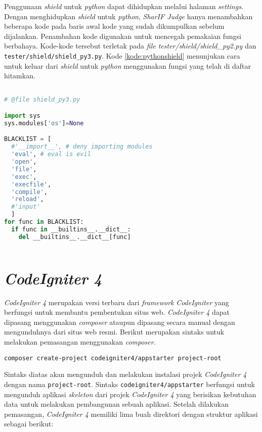 Penggunaan \textit{shield} untuk \textit{python} dapat dihidupkan melalui halaman \textit{settings}. Dengan menghidupkan \textit{shield} untuk \textit{python}, \textit{SharIF Judge} hanya menambahkan beberapa kode pada baris awal kode yang sudah dikumpulkan sebelum dijalankan. Penambahan kode digunakan untuk mencegah pemakaian fungsi berbahaya. Kode-kode tersebut terletak pada \textit{file tester/shield/shield\_py2.py} dan \texttt{tester/shield/shield\_py3.py}. Kode \ref{kode:pythonshield} menunjukan cara untuk keluar dari \textit{shield} untuk \textit{python} menggunakan fungsi yang telah di daftar hitamkan.

\begin{lstlisting}[language=Python,caption=Cara keluar dari \textit{shield} untuk \textit{python},label=kode:pythonshield]

# @file shield_py3.py

import sys
sys.modules['os']=None

BLACKLIST = [
  #'__import__', # deny importing modules
  'eval', # eval is evil
  'open',
  'file',
  'exec',
  'execfile',
  'compile',
  'reload',
  #'input'
  ]
for func in BLACKLIST:
  if func in __builtins__.__dict__:
    del __builtins__.__dict__[func]
    
\end{lstlisting}

\section{\textit{CodeIgniter 4}\cite{codeigniter:23:ci4}}
\label{sec:ci4}

\textit{CodeIgniter 4} merupakan versi terbaru dari \textit{framework} \textit{CodeIgniter} yang berfungsi untuk membantu pembentukan situs web. \textit{CodeIgniter 4} dapat dipasang menggunakan \textit{composer} ataupun dipasang secara manual dengan mengunduhnya dari situs web resmi. Berikut merupakan sintaks untuk melakukan pemasangan menggunakan \textit{composer}.

\begin{center}
\verb|composer create-project codeigniter4/appstarter project-root|
\end{center}

Sintaks diatas akan mengunduh dan melakukan instalasi projek \textit{CodeIgniter 4} dengan nama \texttt{project-root}. Sintaks \texttt{codeigniter4/appstarter} berfungsi untuk mengunduh aplikasi \textit{skeleton} dari projek \textit{CodeIgniter 4} yang berisikan kebutuhan data untuk melakukan pembangunan sebuah aplikasi. Setelah dilakukan pemasangan, \textit{CodeIgniter 4} memiliki lima buah direktori dengan struktur aplikasi sebagai berikut:


